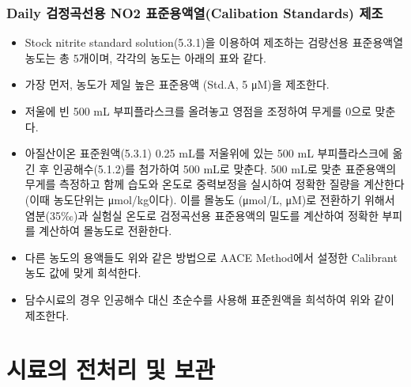\documentclass[
]{book}
\providecommand{\tightlist}{%
  \setlength{\itemsep}{0pt}\setlength{\parskip}{0pt}}
\begin{document}
\hypertarget{daily-uxac80uxc815uxace1uxc120uxc6a9-no2-uxd45cuxc900uxc6a9uxc561uxc5f4calibation-standards-uxc81cuxc870}{%
\subsubsection{Daily 검정곡선용 NO2 표준용액열(Calibation Standards) 제조}\label{daily-uxac80uxc815uxace1uxc120uxc6a9-no2-uxd45cuxc900uxc6a9uxc561uxc5f4calibation-standards-uxc81cuxc870}}

\begin{itemize}
\tightlist
\item
  Stock nitrite standard solution(5.3.1)을 이용하여 제조하는 검량선용 표준용액열 농도는 총 5개이며, 각각의 농도는 아래의 표와 같다.
\item
  가장 먼저, 농도가 제일 높은 표준용액 (Std.A, 5 μM)을 제조한다.
\item
  저울에 빈 500 mL 부피플라스크를 올려놓고 영점을 조정하여 무게를 0으로 맞춘다.
\item
  아질산이온 표준원액(5.3.1) 0.25 mL를 저울위에 있는 500 mL 부피플라스크에 옮긴 후 인공해수(5.1.2)를 첨가하여 500 mL로 맞춘다. 500 mL로 맞춘 표준용액의 무게를 측정하고 함께 습도와 온도로 중력보정을 실시하여 정확한 질량을 계산한다 (이때 농도단위는 μmol/kg이다). 이를 몰농도 (μmol/L, μM)로 전환하기 위해서 염분(35‰)과 실험실 온도로 검정곡선용 표준용액의 밀도를 계산하여 정확한 부피를 계산하여 몰농도로 전환한다.
\item
  다른 농도의 용액들도 위와 같은 방법으로 AACE Method에서 설정한 Calibrant 농도 값에 맞게 희석한다.
\item
  담수시료의 경우 인공해수 대신 초순수를 사용해 표준원액을 희석하여 위와 같이 제조한다.
\end{itemize}

\hypertarget{uxc2dcuxb8ccuxc758-uxc804uxcc98uxb9ac-uxbc0f-uxbcf4uxad00}{%
\section{시료의 전처리 및 보관}\label{uxc2dcuxb8ccuxc758-uxc804uxcc98uxb9ac-uxbc0f-uxbcf4uxad00}}
\end{document}
